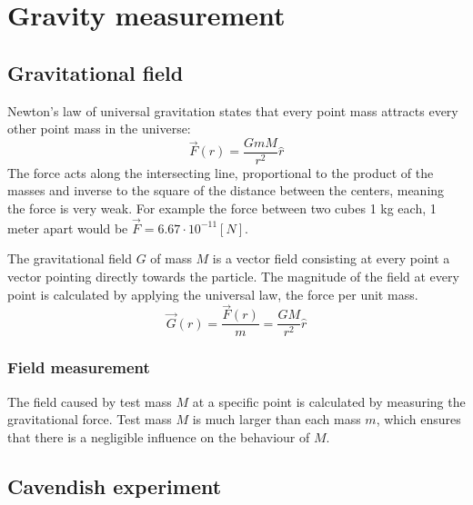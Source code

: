 \documentclass[\main/master.tex]{subfiles}
\begin{document}
\section{Gravity measurement}
\subsection{Gravitational field}
Newton's law of universal gravitation states that every point mass attracts every other point mass in the universe:
\begin{equation}
\overrightarrow{F}(r) = \frac{GmM}{r^2}\hat{r}    \label{eqn:gravitation_force}
\end{equation} 
The force acts along the intersecting line, proportional to the product of the masses and inverse to the square of the distance between the centers, meaning the force is very weak. For example the force between two cubes 1 kg each, 1 meter apart would be $\overrightarrow{F} = 6.67\cdot10^{-11} [N]$.
\par\noindent
The gravitational field $G$ of mass $M$ is a vector field consisting at every point a vector pointing directly towards the particle. The magnitude of the field at every point is calculated by applying the universal law, the force per unit mass. 
\begin{equation}
\overrightarrow{G}(r) = \frac{\overrightarrow{F}(r)}{m} = \frac{GM}{r^2}\hat{r}    \label{eqn:gravitation_field}
\end{equation}
\subsubsection{Field measurement}
\par\noindent
The field caused by test mass $M$ at a specific point is calculated by measuring the gravitational force. Test mass $M$ is much larger than each mass $m$, which ensures that there is a negligible influence on the behaviour of $M$.  



\subsection{Cavendish experiment}
\end{document}

